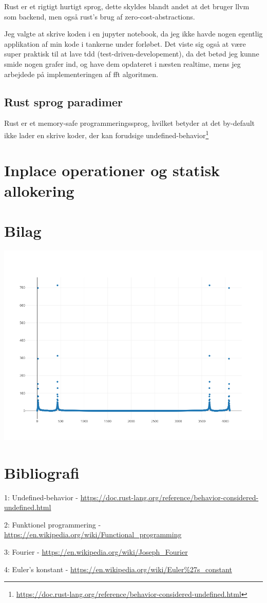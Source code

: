 \documentclass[11pt,a4paper]{article}
\begin{document}
Rust er et rigtigt hurtigt sprog, dette skyldes blandt andet at det bruger llvm som backend,
men også rust's brug af zero-cost-abstractions.

Jeg valgte at skrive koden i en jupyter notebook, da jeg ikke havde nogen egentlig
applikation af min kode i tankerne under forløbet.
Det viste sig også at være super praktisk til at lave tdd (test-driven-developement),
da det betød jeg kunne smide nogen grafer ind, og have dem opdateret i næsten realtime,
mens jeg arbejdede på implementeringen af fft algoritmen.

\subsection{Rust sprog paradimer}
\label{sec:orgd957105}
Rust er et memory-safe programmeringssprog,
hvilket betyder at det by-default ikke lader en skrive koder, der kan forudsige undefined-behavior\footnote{\url{https://doc.rust-lang.org/reference/behavior-considered-undefined.html}}

\section{Inplace operationer og statisk allokering}
\label{sec:org70a886b}

\section{Bilag}
\label{sec:org21df03c}
\begin{center}
\includegraphics[width=.9\linewidth]{./plot1.png}
\end{center}

\section{Bibliografi}
\label{sec:org8999821}

1: Undefined-behavior - \url{https://doc.rust-lang.org/reference/behavior-considered-undefined.html}

2: Funktionel programmering - \url{https://en.wikipedia.org/wiki/Functional\_programming}

3: Fourier - \url{https://en.wikipedia.org/wiki/Joseph\_Fourier}

4: Euler's konstant - \url{https://en.wikipedia.org/wiki/Euler\%27s\_constant}
\end{document}
